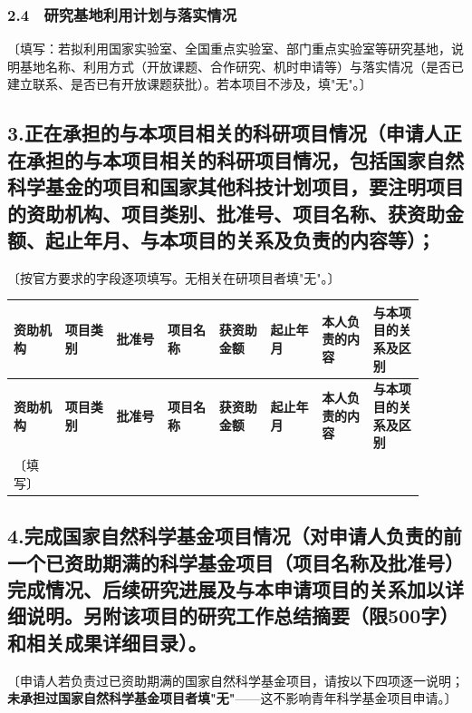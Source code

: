 \documentclass[12pt,a4paper]{ctexart}
\begin{document}
\subsubsection*{2.4　研究基地利用计划与落实情况}

〔填写：若拟利用国家实验室、全国重点实验室、部门重点实验室等研究基地，说明基地名称、利用方式（开放课题、合作研究、机时申请等）与落实情况（是否已建立联系、是否已有开放课题获批）。若本项目不涉及，填"无"。〕

\subsection*{3.正在承担的与本项目相关的科研项目情况（申请人正在承担的与本项目相关的科研项目情况，包括国家自然科学基金的项目和国家其他科技计划项目，要注明项目的资助机构、项目类别、批准号、项目名称、获资助金额、起止年月、与本项目的关系及负责的内容等）；}

〔按官方要求的字段逐项填写。无相关在研项目者填"无"。〕

\begin{longtable}{|>{\raggedright\arraybackslash}p{0.113\linewidth}|>{\raggedright\arraybackslash}p{0.113\linewidth}|>{\raggedright\arraybackslash}p{0.113\linewidth}|>{\raggedright\arraybackslash}p{0.113\linewidth}|>{\raggedright\arraybackslash}p{0.113\linewidth}|>{\raggedright\arraybackslash}p{0.113\linewidth}|>{\raggedright\arraybackslash}p{0.113\linewidth}|>{\raggedright\arraybackslash}p{0.113\linewidth}|}
\hline
\textbf{资助机构} & \textbf{项目类别} & \textbf{批准号} & \textbf{项目名称} & \textbf{获资助金额} & \textbf{起止年月} & \textbf{本人负责的内容} & \textbf{与本项目的关系及区别} \\
\hline
\endfirsthead
\hline
\textbf{资助机构} & \textbf{项目类别} & \textbf{批准号} & \textbf{项目名称} & \textbf{获资助金额} & \textbf{起止年月} & \textbf{本人负责的内容} & \textbf{与本项目的关系及区别} \\
\hline
\endhead
〔填写〕 &  &  &  &  &  &  &  \\
\hline
\end{longtable}

\subsection*{4.完成国家自然科学基金项目情况（对申请人负责的前一个已资助期满的科学基金项目（项目名称及批准号）完成情况、后续研究进展及与本申请项目的关系加以详细说明。另附该项目的研究工作总结摘要（限500字）和相关成果详细目录）。}

〔申请人若负责过已资助期满的国家自然科学基金项目，请按以下四项逐一说明；\textbf{未承担过国家自然科学基金项目者填"无"}——这不影响青年科学基金项目申请。〕
\end{document}
